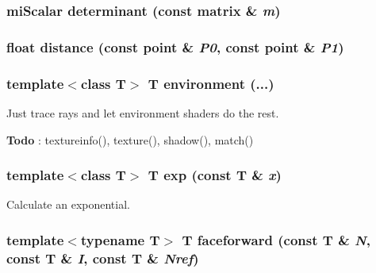 \subsubsection{\setlength{\rightskip}{0pt plus 5cm}mi\-Scalar determinant (const matrix \& {\em m})\hspace{0.3cm}{\tt  [inline]}}\label{namespacersl_a156}


\subsubsection{\setlength{\rightskip}{0pt plus 5cm}float distance (const point \& {\em P0}, const point \& {\em P1})\hspace{0.3cm}{\tt  [inline]}}\label{namespacersl_a152}


\subsubsection{\setlength{\rightskip}{0pt plus 5cm}template$<$class T$>$ T environment (...)\hspace{0.3cm}{\tt  [inline]}}\label{namespacersl_a157}


Just trace rays and let environment shaders do the rest. 

\begin{Desc}
\item[{\bf Todo}]: textureinfo(), texture(), shadow(), match()\end{Desc}
\subsubsection{\setlength{\rightskip}{0pt plus 5cm}template$<$class T$>$ T exp (const T \& {\em x})\hspace{0.3cm}{\tt  [inline]}}\label{namespacersl_a34}


Calculate an exponential. 

\subsubsection{\setlength{\rightskip}{0pt plus 5cm}template$<$typename T$>$ T faceforward (const T \& {\em N}, const T \& {\em I}, const T \& {\em Nref})}\label{namespacersl_a7}


